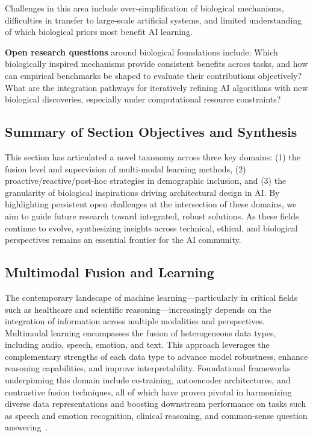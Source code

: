 \documentclass[sigconf]{acmart}
\begin{document}
Challenges in this area include over-simplification of biological mechanisms, difficulties in transfer to large-scale artificial systems, and limited understanding of which biological priors most benefit AI learning.

\textbf{Open research questions} around biological foundations include: Which biologically inspired mechanisms provide consistent benefits across tasks, and how can empirical benchmarks be shaped to evaluate their contributions objectively? What are the integration pathways for iteratively refining AI algorithms with new biological discoveries, especially under computational resource constraints?

\subsection*{Summary of Section Objectives and Synthesis}

This section has articulated a novel taxonomy across three key domains: (1) the fusion level and supervision of multi-modal learning methods, (2) proactive/reactive/post-hoc strategies in demographic inclusion, and (3) the granularity of biological inspirations driving architectural design in AI. By highlighting persistent open challenges at the intersection of these domains, we aim to guide future research toward integrated, robust solutions. As these fields continue to evolve, synthesizing insights across technical, ethical, and biological perspectives remains an essential frontier for the AI community.

\subsection{Multimodal Fusion and Learning}

The contemporary landscape of machine learning—particularly in critical fields such as healthcare and scientific reasoning—increasingly depends on the integration of information across multiple modalities and perspectives. Multimodal learning encompasses the fusion of heterogeneous data types, including audio, speech, emotion, and text. This approach leverages the complementary strengths of each data type to advance model robustness, enhance reasoning capabilities, and improve interpretability. Foundational frameworks underpinning this domain include co-training, autoencoder architectures, and contrastive fusion techniques, all of which have proven pivotal in harmonizing diverse data representations and boosting downstream performance on tasks such as speech and emotion recognition, clinical reasoning, and common-sense question answering~\cite{ref79,ref31,ref36,ref46,ref47,ref48,ref49,ref50,ref55,ref60,ref74,ref75,ref80,ref87,ref88,ref89,ref90}.
\end{document}
